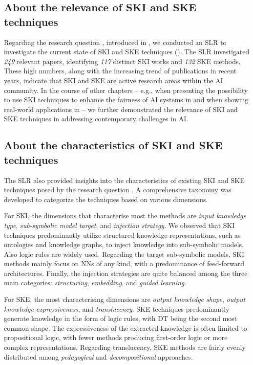 \subsection*{About the relevance of \gls{SKI} and \gls{SKE} techniques}
%
Regarding the research question , introduced in , we conducted an \gls{SLR} to investigate the current state of \gls{SKI} and \gls{SKE} techniques ().
%
The \gls{SLR} investigated \emph{249} relevant papers, identifying \emph{117} distinct \gls{SKI} works and \emph{132} \gls{SKE} methods.
%
These high numbers, along with the increasing trend of publications in recent years, indicate that \gls{SKI} and \gls{SKE} are active research areas within the \gls{AI} community.
%
In the course of other chapters -- e.g., when presenting the possibility to use \gls{SKI} techniques to enhance the fairness of \gls{AI} systems in  and when showing real-world applications in  -- we further demonstrated the relevance of \gls{SKI} and \gls{SKE} techniques in addressing contemporary challenges in \gls{AI}.


\subsection*{About the characteristics of \gls{SKI} and \gls{SKE} techniques}
%
The \gls{SLR} also provided insights into the characteristics of existing \gls{SKI} and \gls{SKE} techniques posed by the research question .
%
A comprehensive taxonomy was developed to categorize the techniques based on various dimensions.


For \gls{SKI}, the dimensions that characterise most the methods are \emph{input knowledge type}, \emph{sub-symbolic model target}, and \emph{injection strategy}.
%
We observed that \gls{SKI} techniques predominantly utilize structured knowledge representations, such as ontologies and knowledge graphs, to inject knowledge into sub-symbolic models.
%
Also logic rules are widely used.
%
Regarding the target sub-symbolic models, \gls{SKI} methods mainly focus on \glspl{NN} of any kind, with a predominance of feed-forward architectures.
%
Finally, the injection strategies are quite balanced among the three main categories: \emph{structuring}, \emph{embedding}, and \emph{guided learning}.


For \gls{SKE}, the most characterising dimensions are \emph{output knowledge shape}, \emph{output knowledge expressiveness}, and \emph{translucency}.
%
\gls{SKE} techniques predominantly generate knowledge in the form of logic rules, with \gls{DT} being the second most common shape.
%
The expressiveness of the extracted knowledge is often limited to propositional logic, with fewer methods producing first-order logic or more complex representations.
%
Regarding translucency, \gls{SKE} methods are fairly evenly distributed among \emph{pedagogical} and \emph{decompositional} approaches.


